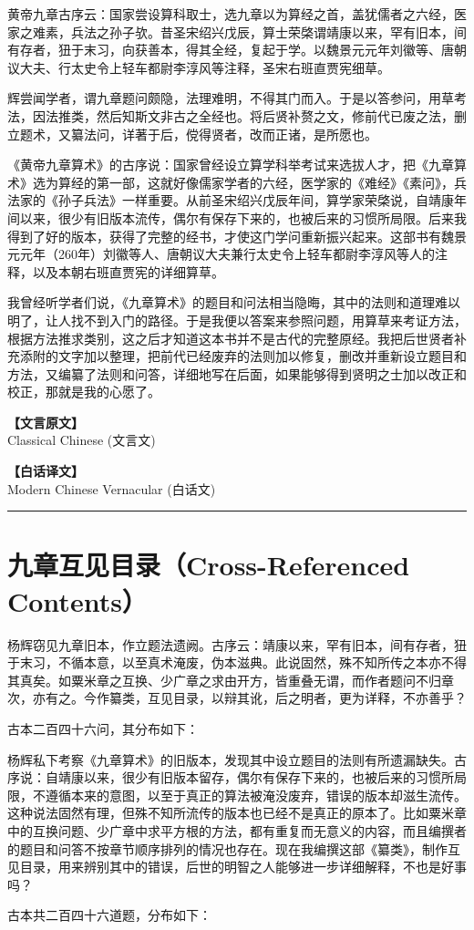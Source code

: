 \documentclass[11pt,a4paper]{article}
\newcommand{\colheader}{%
  \begin{center}
  \begin{minipage}[t]{0.45\textwidth}
  \centering\textcolor{colheadcl}{\textbf{【文言原文】}}\\[2pt]
  \footnotesize\textcolor{colheadcl}{Classical Chinese (文言文)}
  \end{minipage}%
  \hfill%
  \begin{minipage}[t]{0.45\textwidth}
  \centering\textcolor{colheadmd}{\textbf{【白话译文】}}\\[2pt]
  \footnotesize\textcolor{colheadmd}{Modern Chinese Vernacular (白话文)}
  \end{minipage}
  \end{center}
  \vspace{6pt}
  \noindent\rule{\textwidth}{0.4pt}
  \vspace{6pt}
}
\newcommand{\bilingual}[2]{%
\noindent
\begin{minipage}[t]{0.45\textwidth}
\setlength{\parindent}{2em}\setlength{\parskip}{4pt}%
\small\color{prefacecolor}#1%
\end{minipage}%
\hfill
\begin{minipage}[t]{0.45\textwidth}
\setlength{\parindent}{2em}\setlength{\parskip}{4pt}%
\small#2%
\end{minipage}
\vspace{8pt}
}
\begin{document}
\bilingual{%
黄帝九章古序云：国家尝设算科取士，选九章以为算经之首，盖犹儒者之六经，医家之难素，兵法之孙子欤。昔圣宋绍兴戊辰，算士荣棨谓靖康以来，罕有旧本，间有存者，狃于末习，向获善本，得其全经，复起于学。以魏景元元年刘徽等、唐朝议大夫、行太史令上轻车都尉李淳风等注释，圣宋右班直贾宪细草。

辉尝闻学者，谓九章题问颇隐，法理难明，不得其门而入。于是以答参问，用草考法，因法推类，然后知斯文非古之全经也。将后贤补赘之文，修前代已废之法，删立题术，又纂法问，详著于后，傥得贤者，改而正诸，是所愿也。
}{%
《黄帝九章算术》的古序说：国家曾经设立算学科举考试来选拔人才，把《九章算术》选为算经的第一部，这就好像儒家学者的六经，医学家的《难经》《素问》，兵法家的《孙子兵法》一样重要。从前圣宋绍兴戊辰年间，算学家荣棨说，自靖康年间以来，很少有旧版本流传，偶尔有保存下来的，也被后来的习惯所局限。后来我得到了好的版本，获得了完整的经书，才使这门学问重新振兴起来。这部书有魏景元元年（260年）刘徽等人、唐朝议大夫兼行太史令上轻车都尉李淳风等人的注释，以及本朝右班直贾宪的详细算草。

我曾经听学者们说，《九章算术》的题目和问法相当隐晦，其中的法则和道理难以明了，让人找不到入门的路径。于是我便以答案来参照问题，用算草来考证方法，根据方法推求类别，这之后才知道这本书并不是古代的完整原经。我把后世贤者补充添附的文字加以整理，把前代已经废弃的法则加以修复，删改并重新设立题目和方法，又编纂了法则和问答，详细地写在后面，如果能够得到贤明之士加以改正和校正，那就是我的心愿了。
}

\newpage
\colheader

\section*{九章互见目录（Cross-Referenced Contents）}

\bilingual{%
杨辉窃见九章旧本，作立题法遗阙。古序云：靖康以来，罕有旧本，间有存者，狃于末习，不循本意，以至真术淹废，伪本滋典。此说固然，殊不知所传之本亦不得其真矣。如粟米章之互换、少广章之求由开方，皆重叠无谓，而作者题问不归章次，亦有之。今作纂类，互见目录，以辩其讹，后之明者，更为详释，不亦善乎？

古本二百四十六问，其分布如下：
}{%
杨辉私下考察《九章算术》的旧版本，发现其中设立题目的法则有所遗漏缺失。古序说：自靖康以来，很少有旧版本留存，偶尔有保存下来的，也被后来的习惯所局限，不遵循本来的意图，以至于真正的算法被淹没废弃，错误的版本却滋生流传。这种说法固然有理，但殊不知所流传的版本也已经不是真正的原本了。比如粟米章中的互换问题、少广章中求平方根的方法，都有重复而无意义的内容，而且编撰者的题目和问答不按章节顺序排列的情况也存在。现在我编撰这部《纂类》，制作互见目录，用来辨别其中的错误，后世的明智之人能够进一步详细解释，不也是好事吗？

古本共二百四十六道题，分布如下：
}
\end{document}
